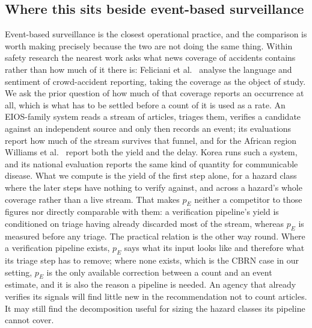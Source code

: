 \documentclass[1p,times]{elsarticle}
\begin{document}
\subsection{Where this sits beside event-based surveillance}
Event-based surveillance is the closest operational practice, and the comparison is worth making precisely because the two are not doing the same thing. Within safety research the nearest work asks what news coverage of accidents contains rather than how much of it there is: Feliciani et al.\ \cite{feliciani2024crowd} analyse the language and sentiment of crowd-accident reporting, taking the coverage as the object of study. We ask the prior question of how much of that coverage reports an occurrence at all, which is what has to be settled before a count of it is used as a rate. An EIOS-family system reads a stream of articles, triages them, verifies a candidate against an independent source and only then records an event; its evaluations report how much of the stream survives that funnel, and for the African region Williams et al.\ \cite{williams2025eios} report both the yield and the delay. Korea runs such a system, and its national evaluation \cite{kim2025ebs} reports the same kind of quantity for communicable disease. What we compute is the yield of the first step alone, for a hazard class where the later steps have nothing to verify against, and across a hazard's whole coverage rather than a live stream. That makes $p_E$ neither a competitor to those figures nor directly comparable with them: a verification pipeline's yield is conditioned on triage having already discarded most of the stream, whereas $p_E$ is measured before any triage. The practical relation is the other way round. Where a verification pipeline exists, $p_E$ says what its input looks like and therefore what its triage step has to remove; where none exists, which is the CBRN case in our setting, $p_E$ is the only available correction between a count and an event estimate, and it is also the reason a pipeline is needed. An agency that already verifies its signals will find little new in the recommendation not to count articles. It may still find the decomposition useful for sizing the hazard classes its pipeline cannot cover.
\end{document}
